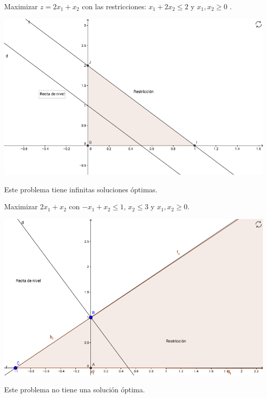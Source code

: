 \documentclass[palatino,nochap]{apuntes}
\begin{document}
\begin{example}
Maximizar $z = 2x_1+x_2$ con las restricciones: $x_1+2x_2 \leq 2$ y $x_1,x_2\geq 0$
.


\begin{center}
\includegraphics[scale=0.45]{img/io-intro_2.png}
\end{center}


Este problema tiene infinitas soluciones óptimas.
\end{example}

\begin{example}
Maximizar $2x_1 + x_2$ con $-x_1+x_2\leq 1$, $x_2\leq 3$ y $x_1,x_2\geq 0$.


\begin{center}
\includegraphics[scale=0.45]{img/io-intro_3.png}
\end{center}

Este problema no tiene una solución óptima.
\end{example}
\end{document}
